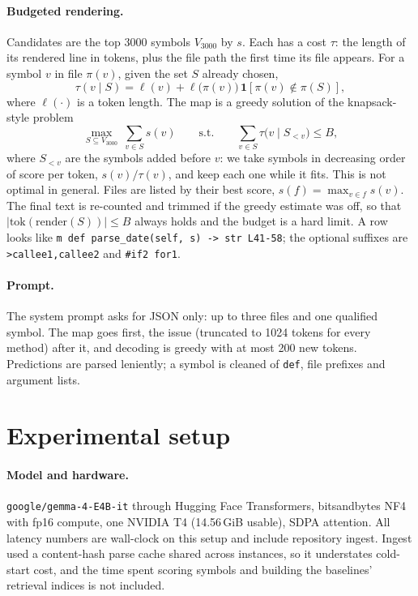 \documentclass[10pt]{article}
\newcommand{\ind}[1]{\mathbf{1}\!\left[#1\right]}
\begin{document}
\paragraph{Budgeted rendering.} Candidates are the top 3000 symbols $V_{3000}$ by $s$. Each has a cost $\tau$: the length of its rendered line in tokens, plus the file path the first time its file appears. For a symbol $v$ in file $\pi(v)$, given the set $S$ already chosen,
\begin{equation}\label{eq:cost}
\tau(v\mid S)=\ell(v)+\ell\bigl(\pi(v)\bigr)\,\ind{\pi(v)\notin\pi(S)},
\end{equation}
where $\ell(\cdot)$ is a token length. The map is a greedy solution of the knapsack-style problem
\begin{equation}\label{eq:knap}
\max_{S\subseteq V_{3000}}\ \sum_{v\in S}s(v)\qquad\text{s.t.}\qquad \sum_{v\in S}\tau\bigl(v\mid S_{<v}\bigr)\le B,
\end{equation}
where $S_{<v}$ are the symbols added before $v$: we take symbols in decreasing order of score per token, $s(v)/\tau(v)$, and keep each one while it fits. This is not optimal in general. Files are listed by their best score, $s(f)=\max_{v\in f}s(v)$. The final text is re-counted and trimmed if the greedy estimate was off, so that $|\mathrm{tok}(\mathrm{render}(S))|\le B$ always holds and the budget is a hard limit. A row looks like \texttt{m def parse\_date(self, s) -> str L41-58}; the optional suffixes are \texttt{>callee1,callee2} and \texttt{\#if2 for1}.

\paragraph{Prompt.} The system prompt asks for JSON only: up to three files and one qualified symbol. The map goes first, the issue (truncated to 1024 tokens for every method) after it, and decoding is greedy with at most 200 new tokens. Predictions are parsed leniently; a symbol is cleaned of \texttt{def}, file prefixes and argument lists.

\section{Experimental setup}
\paragraph{Model and hardware.} \texttt{google/gemma-4-E4B-it} \cite{gemma} through Hugging Face Transformers, bitsandbytes NF4 \cite{qlora} with fp16 compute, one NVIDIA T4 (14.56\,GiB usable), SDPA attention. All latency numbers are wall-clock on this setup and include repository ingest. Ingest used a content-hash parse cache shared across instances, so it understates cold-start cost, and the time spent scoring symbols and building the baselines' retrieval indices is not included.
\end{document}

